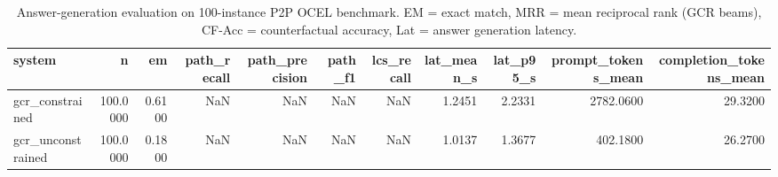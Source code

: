\begin{table}
\caption{Answer-generation evaluation on 100-instance P2P OCEL benchmark. EM = exact match, MRR = mean reciprocal rank (GCR beams), CF-Acc = counterfactual accuracy, Lat = answer generation latency.}
\label{tab:answer_results}
\begin{tabular}{lrrrrrrrrrr}
\toprule
system & n & em & path_recall & path_precision & path_f1 & lcs_recall & lat_mean_s & lat_p95_s & prompt_tokens_mean & completion_tokens_mean \\
\midrule
gcr_constrained & 100.0000 & 0.6100 & NaN & NaN & NaN & NaN & 1.2451 & 2.2331 & 2782.0600 & 29.3200 \\
gcr_unconstrained & 100.0000 & 0.1800 & NaN & NaN & NaN & NaN & 1.0137 & 1.3677 & 402.1800 & 26.2700 \\
\bottomrule
\end{tabular}
\end{table}
